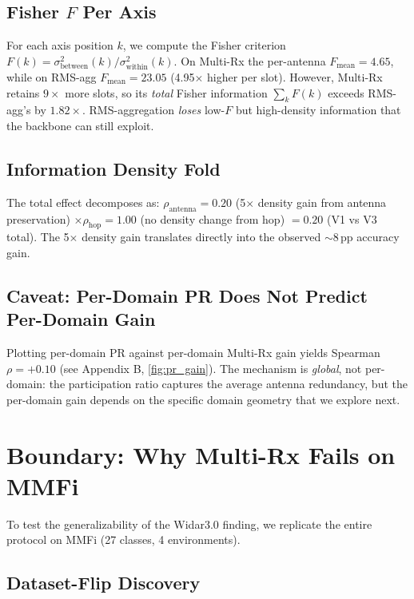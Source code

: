 \documentclass[11pt]{article}
\theoremstyle{definition}
\begin{document}
\subsection{Fisher $F$ Per Axis}

For each axis position $k$, we compute the Fisher criterion $F(k) = \sigma^2_{\text{between}}(k) / \sigma^2_{\text{within}}(k)$. On Multi-Rx the per-antenna $F_{\text{mean}} = 4.65$, while on RMS-agg $F_{\text{mean}} = 23.05$ (4.95$\times$ higher per slot). However, Multi-Rx retains $9\times$ more slots, so its \emph{total} Fisher information $\sum_k F(k)$ exceeds RMS-agg's by $1.82 \times$. RMS-aggregation \emph{loses} low-$F$ but high-density information that the backbone can still exploit.

\subsection{Information Density Fold}

The total effect decomposes as: $\rho_{\text{antenna}} = 0.20$ (5$\times$ density gain from antenna preservation) $\times \rho_{\text{hop}} = 1.00$ (no density change from hop) $= 0.20$ (V1 vs V3 total). The 5$\times$ density gain translates directly into the observed $\sim$8\,pp accuracy gain.

\subsection{Caveat: Per-Domain PR Does Not Predict Per-Domain Gain}

Plotting per-domain PR against per-domain Multi-Rx gain yields Spearman $\rho = +0.10$ (see Appendix B, \ref{fig:pr_gain}). The mechanism is \emph{global}, not per-domain: the participation ratio captures the average antenna redundancy, but the per-domain gain depends on the specific domain geometry that we explore next.

\section{Boundary: Why Multi-Rx Fails on MMFi}
\label{sec:boundary}

To test the generalizability of the Widar3.0 finding, we replicate the entire protocol on MMFi (27 classes, 4 environments).

\subsection{Dataset-Flip Discovery}
\end{document}

